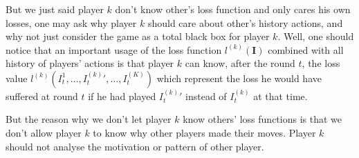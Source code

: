 \documentclass{article} %
\begin{document}
But we just said player $k$ don't know other's loss function and only cares his own losses, one may ask why player $k$ should care about other's history actions, and why not just consider the game as a total black box for player $k$. Well, one should notice that an important usage of the loss function $l^{(k)}(\mathbf{I})$ combined with all history of players' actions is that player $k$ can know, after the round $t$, the loss value $l^{(k)}(I^1_t,\dots,{I^{(k)}_t}',\dots, I^{(K)}_t)$ which represent the loss he would have suffered at round $t$ if he had played ${I^{(k)}_t}'$ instead of $I^{(k)}_t$ at that time.

But the reason why we don't let player $k$ know others' loss functions is that we don't allow player $k$ to know why other players made their moves. Player $k$ should not analyse the motivation or pattern of other player.
\end{document}
